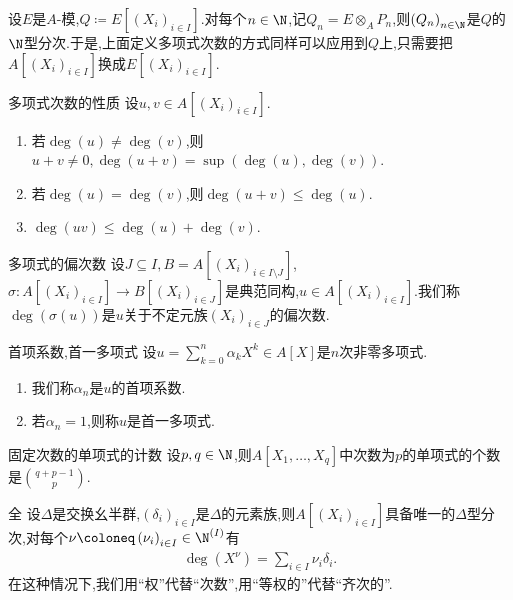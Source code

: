 \begin{remark}{}{}
	设$E$是$A$-模,$Q\coloneq E[(X_{i})_{i\in I}]$.对每个$n\in\N$,记$Q_{n}=E\otimes_{A}P_{n}$,则$\left(Q_{n}\right)_{n\in\N}$是$Q$的$\N$型分次.于是,上面定义多项式次数的方式同样可以应用到$Q$上,只需要把$A[(X_{i})_{i\in I}]$换成$E[(X_{i})_{i\in I}]$.
\end{remark}

\begin{proposition}{多项式次数的性质}{}
	设$u,v\in A[(X_{i})_{i\in I}]$.
	\begin{enumerate}
		\item 若$\deg\left(u\right)\neq\deg\left(v\right)$,则$u+v\neq 0,\deg\left(u+v\right)=\sup\left(\deg\left(u\right),\deg\left(v\right)\right)$.
		\item 若$\deg\left(u\right)=\deg\left(v\right)$,则$\deg\left(u+v\right)\leq\deg\left(u\right)$.
		\item $\deg\left(uv\right)\leq\deg\left(u\right)+\deg\left(v\right)$.
	\end{enumerate}
\end{proposition}

\begin{definition}{多项式的偏次数}{}
	设$J\subseteq I,B=A[(X_{i})_{i\in I\setminus J}]$,$\sigma:A[(X_{i})_{i\in I}]\to B[(X_{i})_{i\in J}]$是典范同构,$u\in A[(X_{i})_{i\in I}]$.我们称$\deg\left(\sigma\left(u\right)\right)$是$u$关于不定元族$\left(X_{i}\right)_{i\in J}$的偏次数.
\end{definition}

\begin{definition}{首项系数,首一多项式}{}
	设$u=\sum\limits_{k=0}^{n}\alpha_{k}X^{k}\in A[X]$是$n$次非零多项式.
	\begin{enumerate}
		\item 我们称$\alpha_{n}$是$u$的首项系数.
		\item 若$\alpha_{n}=1$,则称$u$是首一多项式.
	\end{enumerate}
\end{definition}

\begin{theorem}{固定次数的单项式的计数}{}
	设$p,q\in\N$,则$A\left[X_{1},\ldots,X_{q}\right]$中次数为$p$的单项式的个数是$\binom{q+p-1}{p}$.
\end{theorem}

\begin{definition}{全}{}
	设$\Delta$是交换幺半群,$\left(\delta_{i}\right)_{i\in I}$是$\Delta$的元素族,则$A[(X_{i})_{i\in I}]$具备唯一的$\Delta$型分次,对每个$\nu\coloneq\left(\nu_{i}\right)_{i\in I}\in\N^{\left(I\right)}$有
	\begin{align*}
		\deg\left(X^{\nu}\right)=\sum\limits_{i\in I}\nu_{i}\delta_{i}.
	\end{align*}
	在这种情况下,我们用``权''代替``次数'',用``等权的''代替``齐次的''.
\end{definition}

